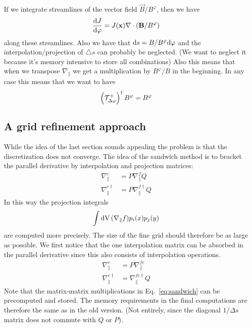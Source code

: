 If we integrate streamlines of the vector field $\vec B/B^\varphi$, then we have
\begin{align}
    \frac{\mathrm{d} J}{\mathrm{d} \varphi} = J({\mathbf{x}} ) \nabla\cdot\left( {\mathbf{B}}/B^\varphi\right)
    \label{}
\end{align}
along these streamlines.
Also we have that $\mathrm{d} s = B/B^\varphi \mathrm{d} \varphi $ and the interpolation/projection of $\triangle s$ can probably be neglected. (We want to neglect it because it's memory intensive to store all combinations)
Also this means that when we transpose $\nabla_\parallel$ we get a 
multiplication by $B^\varphi/B$ in the beginning.
In any case this means that we want to have 
\begin{align}
\left(\mathcal T^+_{\Delta\varphi}\right)^\dagger B^\varphi  =  B^\varphi
\end{align}


\subsection{A grid refinement approach}
While the idea of the last section sounds appealing the problem 
is that the discretization does not converge.
The idea of the sandwich method \cite{Stegmeir2016} is 
to bracket the parallel derivative by interpolation and 
projection matrices:
\begin{align}
    \nabla^c_\parallel &= P\nabla_\parallel^f Q \\
    \nabla^{c\dagger}_\parallel &= P \nabla^{f\dagger}_\parallel Q
    \label{eq:sandwich}
\end{align}
In this way the projection integrals
\begin{align}
    \int\mathrm{dV}\, (\nabla_\parallel f) p_i(x)p_j(y) 
    \label{}
\end{align}
are computed more precisely.
The size of the fine grid should therefore be as large as
possible.
We first notice that the one interpolation matrix can be absorbed
in the parallel derivative since this also consists of 
interpolation operations. 
\begin{align}
    \nabla^c_\parallel &= P\nabla_\parallel^{fc} \\
    \nabla^{c\dagger}_\parallel &= \nabla^{fc\dagger}_\parallel Q
    \label{eq:sandwich}
\end{align}
Note that the matrix-matrix multiplications in Eq.~\eqref{eq:sandwich} can
be precomputed and stored. The memory requirements 
in the final computations are 
therefore the same  as in the old version. (Not entirely, since
the diagonal $1/\Delta s$ matrix does not commute with $Q$ or $P$).


